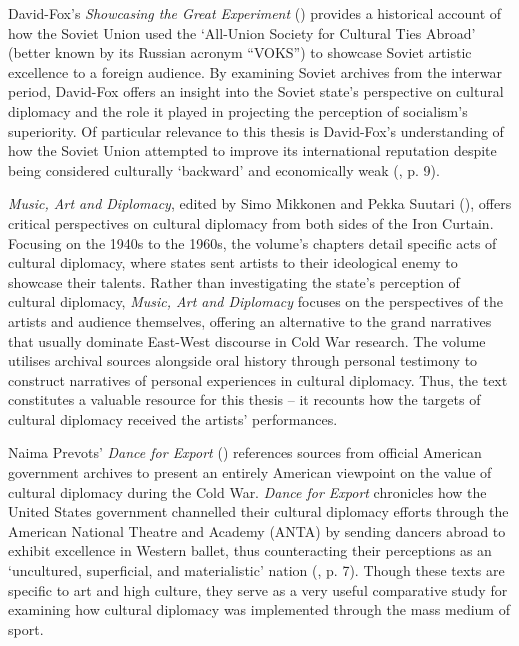 David-Fox’s \textit{Showcasing the Great Experiment} (\citeyear{david-fox2011}) provides a historical account of how the Soviet Union used the ‘All-Union Society for Cultural Ties Abroad’ (better known by its Russian acronym “VOKS”) to showcase Soviet artistic excellence to a foreign audience. By examining Soviet archives from the interwar period, David-Fox offers an insight into the Soviet state’s perspective on cultural diplomacy and the role it played in projecting the perception of socialism’s superiority. Of particular relevance to this thesis is David-Fox’s understanding of how the Soviet Union attempted to improve its international reputation despite being considered culturally ‘backward’ and economically weak (\citeyear{david-fox2011}, p. 9).

\textit{Music, Art and Diplomacy}, edited by Simo Mikkonen and Pekka Suutari (\citeyear{mikkonensuutari2016}), offers critical perspectives on cultural diplomacy from both sides of the Iron Curtain. Focusing on the 1940s to the 1960s, the volume’s chapters detail specific acts of cultural diplomacy, where states sent artists to their ideological enemy to showcase their talents. Rather than investigating the state’s perception of cultural diplomacy, \textit{Music, Art and Diplomacy} focuses on the perspectives of the artists and audience themselves, offering an alternative to the grand narratives that usually dominate East-West discourse in Cold War research. The volume utilises archival sources alongside oral history through personal testimony to construct narratives of personal experiences in cultural diplomacy. Thus, the text constitutes a valuable resource for this thesis – it recounts how the targets of cultural diplomacy received the artists’ performances.

Naima Prevots’ \textit{Dance for Export} (\citeyear{prevots1998}) references sources from official American government archives to present an entirely American viewpoint on the value of cultural diplomacy during the Cold War. \textit{Dance for Export} chronicles how the United States government channelled their cultural diplomacy efforts through the American National Theatre and Academy (ANTA) by sending dancers abroad to exhibit excellence in Western ballet, thus counteracting their perceptions as an ‘uncultured, superficial, and materialistic’ nation (\cite{prevots1998}, p. 7). Though these texts are specific to art and high culture, they serve as a very useful comparative study for examining how cultural diplomacy was implemented through the mass medium of sport.

